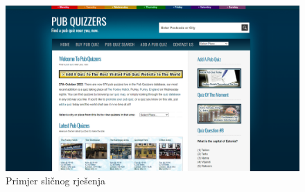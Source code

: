 		\begin{figure}[H]
			\includegraphics[width=\textwidth]{slike/slicnoRjesenje.PNG} 
			\caption{Primjer sličnog rješenja}
			\label{fig:slicnoRjesenje}
		\end{figure}

		
		
	